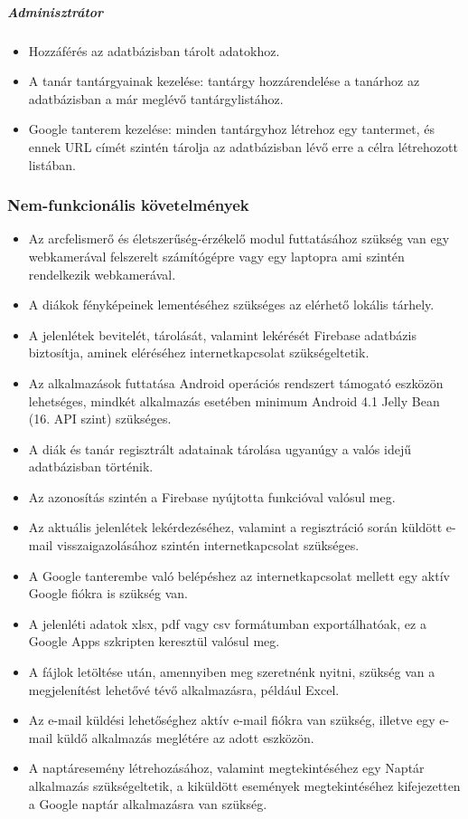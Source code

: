 \subparagraph*{Adminisztrátor}
\begin{itemize}
	\item{Hozzáférés az adatbázisban tárolt adatokhoz.}
	\item{A tanár tantárgyainak kezelése: tantárgy hozzárendelése a tanárhoz az adatbázisban a már meglévő tantárgylistához.}
	\item{Google tanterem kezelése: minden tantárgyhoz létrehoz egy tantermet, és ennek URL címét szintén tárolja az adatbázisban lévő erre a célra létrehozott listában.}\\
\end{itemize}


\subsubsection{Nem-funkcionális követelmények}

\begin{itemize}
    \item {Az arcfelismerő és életszerűség-érzékelő modul futtatásához szükség van egy webkamerával felszerelt számítógépre vagy egy laptopra ami szintén rendelkezik webkamerával.}
    \item {A diákok fényképeinek lementéséhez szükséges az elérhető lokális tárhely.}
    \item {A jelenlétek bevitelét, tárolását, valamint lekérését Firebase adatbázis biztosítja, aminek eléréséhez internetkapcsolat szükségeltetik.}
	\item {Az alkalmazások futtatása Android operációs rendszert támogató eszközön lehetséges, mindkét alkalmazás esetében  minimum Android 4.1 Jelly Bean (16. API szint) szükséges.}
	\item {A diák és tanár regisztrált adatainak tárolása ugyanúgy a valós idejű adatbázisban történik.}
	\item{Az azonosítás szintén a Firebase nyújtotta funkcióval valósul meg.}
	\item {Az aktuális jelenlétek lekérdezéséhez, valamint a regisztráció során küldött e-mail visszaigazolásához szintén internetkapcsolat szükséges.}
	\item {A Google tanterembe való belépéshez az internetkapcsolat mellett egy aktív Google fiókra is szükség van.}
	\item{A jelenléti adatok xlsx, pdf vagy csv formátumban exportálhatóak, ez a Google Apps szkripten keresztül valósul meg.}
	\item{A fájlok letöltése után, amennyiben meg szeretnénk nyitni, szükség van a megjelenítést lehetővé tévő alkalmazásra, például Excel.}
	\item{Az e-mail küldési lehetőséghez aktív e-mail fiókra van szükség, illetve egy e-mail küldő alkalmazás meglétére az adott eszközön.}
	\item{A naptáresemény létrehozásához, valamint megtekintéséhez egy Naptár alkalmazás szükségeltetik, a kiküldött események megtekintéséhez kifejezetten a Google naptár alkalmazásra van szükség.}
\end{itemize}
